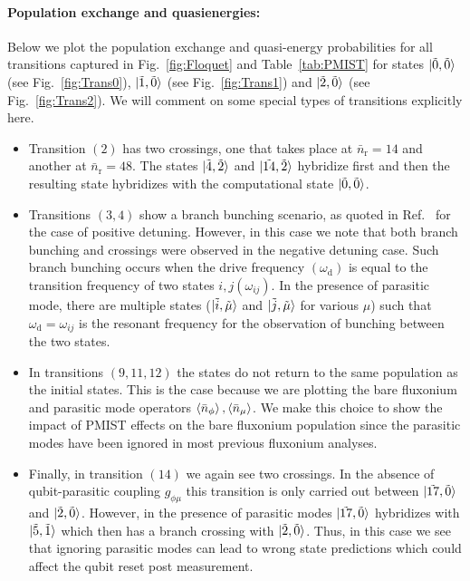 \documentclass[%
reprint,
superscriptaddress,
 amsmath,amssymb,
 aps,
 prx,
longbibliography,
floatfix,
]{revtex4-2}
\begin{document}
\paragraph{Population exchange and quasienergies:}\label{app:Floquet-trans}
Below we plot the population exchange and quasi-energy probabilities for all transitions captured in Fig.~\ref{fig:Floquet} and Table~\ref{tab:PMIST} for states $\ket{\tilde{0},\tilde{0}}$ (see Fig.~\ref{fig:Trans0}), $\ket{\tilde{1},\tilde{0}}$ (see Fig.~\ref{fig:Trans1}) and $\ket{\tilde{2},\tilde{0}}$ (see Fig.~\ref{fig:Trans2}). We will comment on some special types of transitions explicitly here.

\begin{itemize}
    \item Transition $(2)$ has two crossings, one that takes place at $\bar n_\textrm{r}=14$ and another at $\bar n_\textrm{r}=48$. The states $\ket{\tilde{4},\tilde{2}}$ and $\ket{\tilde{14},\tilde{2}}$ hybridize first and then the resulting state hybridizes with the computational state $\ket{\tilde{0},\tilde{0}}$.
    \item Transitions $(3,4)$ show a branch bunching scenario, as quoted in Ref.~\cite{dumas2024unified} for the case of positive detuning. However, in this case we note that both branch bunching and crossings were observed in the negative detuning case. Such branch bunching occurs when the drive frequency $(\omega_\textrm{d})$ is equal to the transition frequency of two states $i,j (\omega_{ij})$. In the presence of parasitic mode, there are multiple states ($\ket{\tilde{i},\tilde{\mu
    }}$ and $\ket{\tilde{j},\tilde{\mu}}$ for various $\mu$) such that $\omega_\textrm{d}=\omega_{ij}$ is the resonant frequency for the observation of bunching between the two states.
    \item In transitions $(9,11,12)$ the states do not return to the same population as the initial states. This is the case because we are plotting the bare fluxonium and parasitic mode operators $\braket{\bar n_\phi},\braket{\bar n_\mu}$. We make this choice to show the impact of PMIST effects on the bare fluxonium population since the parasitic modes have been ignored in most previous fluxonium analyses.
    \item Finally, in transition $(14)$ we again see two crossings. In the absence of qubit-parasitic coupling $g_{\phi\mu}$ this transition is only carried out between  $\ket{\tilde{17},\tilde{0}}$ and $\ket{\tilde{2},\tilde{0}}$. However, in the presence of parasitic modes $\ket{\tilde{17},\tilde{0}}$ hybridizes with $\ket{\tilde{5},\tilde{1}}$ which then has a branch crossing with $\ket{\tilde{2},\tilde{0}}$. Thus, in this case we see that ignoring parasitic modes can lead to wrong state predictions which could affect the qubit reset post measurement.
\end{itemize}
\end{document}

